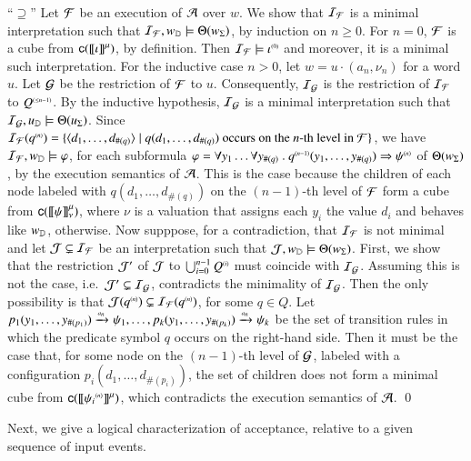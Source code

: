\documentclass{llncs}
\begin{document}
{  ``$\supseteq$'' Let $\mathcal{F}$ be an execution of $\mathcal{A}$ over $w$. We show
  that $\mathcal{I}_{\mathcal{F}}$ is a minimal interpretation such that $\mathcal{I}_{\mathcal{F}},
  w_{\mathbb{D}} \models \Theta({w_\Sigma})$, by induction on $n \geq
  0$. For $n=0$, $\mathcal{F}$ is a cube from $\mathsf{c}({{\bf [\![} \iota {\bf ]\!]}^\mu})$, by
  definition. Then $\mathcal{I}_{\mathcal{F}} \models {\iota}^{\scriptscriptstyle{({0})}}$ and moreover, it
  is a minimal such interpretation. For the inductive case $n > 0$,
  let $w=u\cdot(a_n,\nu_n)$ for a word $u$. Let $\mathcal{G}$ be the
  restriction of $\mathcal{F}$ to $u$. Consequently, $\mathcal{I}_{\mathcal{G}}$ is the restriction
  of $\mathcal{I}_{\mathcal{F}}$ to ${Q}^{\scriptscriptstyle{({\leq n-1})}}$. By the inductive hypothesis,
  $\mathcal{I}_{\mathcal{G}}$ is a minimal interpretation such that \(\mathcal{I}_{\mathcal{G}}, u_{\mathbb{D}}
  \models \Theta({u_\Sigma})\). Since $\mathcal{I}_{\mathcal{F}}({q}^{\scriptscriptstyle{({n})}}) =
  \{ \langle d_1,\ldots,d_{\#(q)} \rangle \mid q(d_1,\ldots,d_{\#(q)})
    \text{ occurs on the $n$-th level in $\mathcal{F}$} \}$, we have $\mathcal{I}_{\mathcal{F}},
  w_{\mathbb{D}} \models \varphi$, for each subformula $\varphi = \forall y_1
  \ldots \forall y_{\#(q)} ~.~ {q}^{\scriptscriptstyle{({n-1})}}(y_1,\ldots,y_{\#(q)})
  \Rightarrow {\psi}^{\scriptscriptstyle{({n})}}$ of $\Theta({w_\Sigma})$, by the
  execution semantics of $\mathcal{A}$. This is the case because the children
  of each node labeled with $q(d_1,\ldots,d_{\#(q)})$ on the
  $(n-1)$-th level of $\mathcal{F}$ form a cube from
  $\mathsf{c}({{\bf [\![} \psi {\bf ]\!]}^\mu_\nu})$, where $\nu$ is a valuation that assigns
  each $y_i$ the value $d_i$ and behaves like $w_{\mathbb{D}}$,
  otherwise. Now supppose, for a contradiction, that $\mathcal{I}_{\mathcal{F}}$ is not
  minimal and let $\mathcal{J} \subsetneq \mathcal{I}_{\mathcal{F}}$ be an interpretation such
  that $\mathcal{J},w_{\mathbb{D}} \models \Theta({w_\Sigma})$. First, we show that
  the restriction $\mathcal{J}'$ of $\mathcal{J}$ to $\bigcup_{i=0}^{n-1} {Q}^{\scriptscriptstyle{({i})}}$
  must coincide with $\mathcal{I}_{\mathcal{G}}$. Assuming this is not the case,
  i.e.\ $\mathcal{J}' \subsetneq \mathcal{I}_{\mathcal{G}}$, contradicts the minimality of
  $\mathcal{I}_{\mathcal{G}}$. Then the only possibility is that $\mathcal{J}({q}^{\scriptscriptstyle{({n})}})
  \subsetneq \mathcal{I}_{\mathcal{F}}({q}^{\scriptscriptstyle{({n})}})$, for some $q \in Q$. Let
  $p_1(y_1,\ldots,y_{\#(p_1)}) \xrightarrow{{\scriptscriptstyle a_n}}_{{\scriptstyle }} \psi_1, \ldots,
  p_k(y_1,\ldots,y_{\#(p_k)}) \xrightarrow{{\scriptscriptstyle a_n}}_{{\scriptstyle }} \psi_k$ be the set of
  transition rules in which the predicate symbol $q$ occurs on the
  right-hand side. Then it must be the case that, for some node on the
  $(n-1)$-th level of $\mathcal{G}$, labeled with a configuration
  $p_i(d_1,\ldots,d_{\#(p_i)})$, the set of children does not form a
  minimal cube from $\mathsf{c}({{\bf [\![} {\psi_i}^{\scriptscriptstyle{({n})}} {\bf ]\!]}^\mu})$, which
  contradicts the execution semantics of $\mathcal{A}$. \qed}

Next, we give a logical characterization of acceptance, relative to a
given sequence of input events. 
\end{document}

